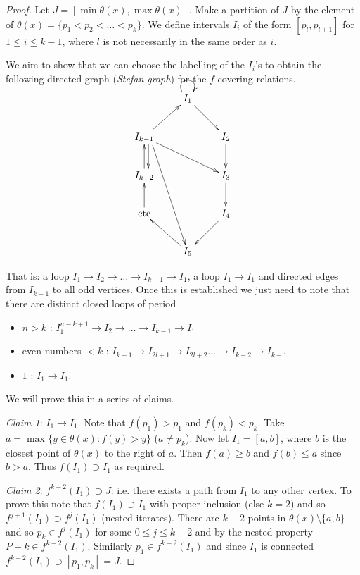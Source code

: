 \documentclass{notes}
\theoremstyle{plain}
\begin{document}
\begin{proof}
Let $J = [\min \theta(x), \max \theta(x)]$.  Make a partition of $J$
by the element of $\theta(x) = \{ p_1 < p_2 < \dots < p_k \}$.  We
define intervals $I_i$ of the form $[p_l,p_{l+1}]$ for $1 \le i \le
k-1$, where $l$ is not necessarily in the same order as $i$.

We aim to show that we can choose the labelling of the $I_i$'s to
obtain the following directed graph (\emph{Stefan graph}) for the
$f$-covering relations.
\vspace{1cm}
\[
\xymatrix{
& \ar@(ul,ur)[] I_1 \ar[dr] & \\
 I_{k-1} \ar[ur] \ar[drr] \ar@<1ex>[d] \ar[]+<2ex,-2ex>;[dddr] & & I_2 \ar[d]  \\
I_{k-2} \ar[u] & & I_3 \ar[d] \\
\text{etc} \ar[u] & & I_4 \ar[dl] \\
& I_5 \ar[ul] & \\
}
\]

That is: a loop $I_1 \to I_2 \to \dots \to I_{k-1} \to I_1$, a loop $I_1
\to I_1$ and directed edges from $I_{k-1}$ to all odd vertices.  Once
this is established we just need to note that there are distinct
closed loops of period
\begin{itemize}
\item $n > k$ : $I_1^{n-k+1} \to I_2 \to \dots \to I_{k-1} \to I_1$
\item even numbers $< k$ : $I_{k-1} \to I_{2 l + 1} \to I_{2 l + 2}
\dots \to I_{k-2} \to I_{k-1}$
\item $1$ : $I_1 \to I_1$.
\end{itemize}

We will prove this in a series of claims.

\emph{Claim 1}: $I_1 \to I_1$.  Note that $f(p_1) > p_1$ and $f(p_k) <
p_k$.  Take $a= \max \{ y \in \theta(x) : f(y) > y\}$ ($a \neq p_k$).
Now let $I_1 = [a,b]$, where $b$ is the closest point of $\theta(x)$
to the right of $a$.  Then $f(a) \ge b$ and $f(b) \le a$ since $b >
a$.  Thus $f(I_1) \supset I_1$ as required.

\emph{Claim 2}: $f^{k-2}(I_1) \supset J$: i.e. there exists a path
from $I_1$ to any other vertex.  To prove this note that $f(I_1)
\supset I_1$ with proper inclusion (else $k=2$) and so $f^{j+1}(I_1)
\supset f^j(I_1)$ (nested iterates).  There are $k-2$ points in
$\theta(x) \setminus \{a,b\}$ and so $p_k \in f^j(I_1)$ for some $0
\le j \le k-2$ and by the nested property $P-k \in f^{k-2}(I_1)$.
Similarly $p_1 \in f^{k-2}(I_1)$ and since $I_1$ is connected
$f^{k-2}(I_1) \supset [p_1,p_k] = J$.


\end{proof}
\end{document}
